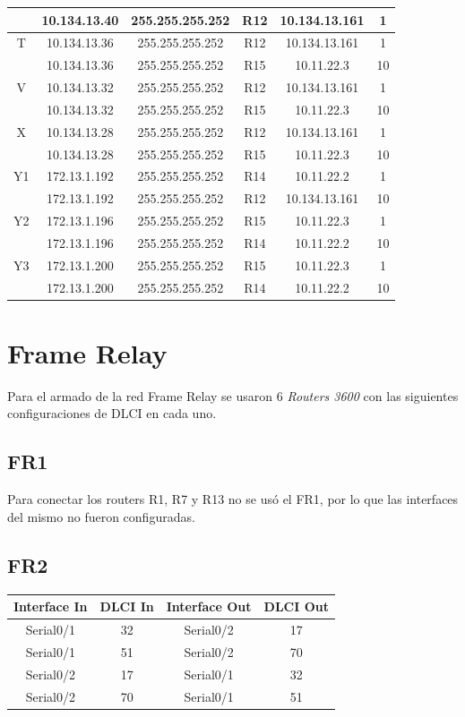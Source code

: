 \documentclass[12pt, a4paper, spanish]{article}
\begin{document}
\begin{center}
\begin{tabular}{|c|c|c|c|c|c|}
	 & 10.134.13.40 & 255.255.255.252 & R12 & 10.134.13.161 & 1\\
	\hline
	T & 10.134.13.36 & 255.255.255.252 & R12 & 10.134.13.161 & 1\\
	 & 10.134.13.36 & 255.255.255.252 & R15 & 10.11.22.3 & 10\\
	\hline
	V & 10.134.13.32 & 255.255.255.252 & R12 & 10.134.13.161 & 1\\
	 & 10.134.13.32 & 255.255.255.252 & R15 & 10.11.22.3 & 10\\
	\hline
	X & 10.134.13.28 & 255.255.255.252 & R12 & 10.134.13.161 & 1\\
	 & 10.134.13.28 & 255.255.255.252 & R15 & 10.11.22.3 & 10\\
	\hline
	Y1 & 172.13.1.192 & 255.255.255.252 & R14 & 10.11.22.2 & 1\\
	 & 172.13.1.192 & 255.255.255.252 & R12 & 10.134.13.161 & 10\\
	\hline
	Y2 & 172.13.1.196 & 255.255.255.252 & R15 & 10.11.22.3 & 1\\
	 & 172.13.1.196 & 255.255.255.252 & R14 & 10.11.22.2 & 10\\
	\hline
	Y3 & 172.13.1.200 & 255.255.255.252 & R15 & 10.11.22.3 & 1\\
	 & 172.13.1.200 & 255.255.255.252 & R14 & 10.11.22.2 & 10\\
	\hline
\end{tabular}
\end{center}

\newpage
\section{Frame Relay}
Para el armado de la red Frame Relay se usaron 6 \emph{Routers 3600}
con las siguientes configuraciones de DLCI en cada uno.
\subsection{FR1}
Para conectar los routers R1, R7 y R13 no se usó el FR1, por lo que las 
interfaces del mismo no fueron configuradas.

\subsection{FR2}
\begin{center}
\begin{tabular}{|c|c|c|c|}
\hline
Interface In & DLCI In & Interface Out & DLCI Out \\
\hline
\hline
Serial0/1 & 32 & Serial0/2 & 17 \\
\hline
Serial0/1 & 51 & Serial0/2 & 70 \\
\hline
Serial0/2 & 17 & Serial0/1 & 32 \\
\hline
Serial0/2 & 70 & Serial0/1 & 51 \\
\hline
\end{tabular}
\end{center}
\end{document}

